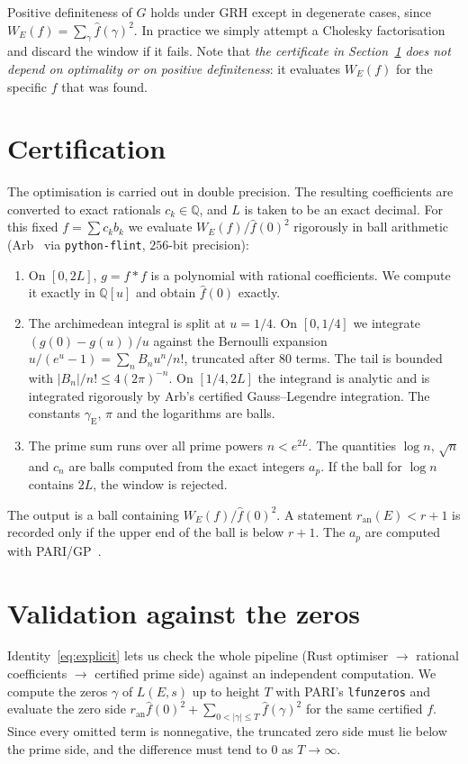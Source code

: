 \documentclass[11pt]{amsart}
\theoremstyle{remark}
\theoremstyle{definition}
\newcommand{\Q}{\mathbb{Q}}
\newcommand{\ran}{r_{\mathrm{an}}}
\begin{document}
Positive definiteness of $G$ holds under GRH except in degenerate cases, since $W_E(f)=\sum_\gamma\hat f(\gamma)^2$. In practice we simply attempt a Cholesky factorisation and discard the window if it fails. Note that \emph{the certificate in Section~\ref{sec:cert} does not depend on optimality or on positive definiteness}: it evaluates $W_E(f)$ for the specific $f$ that was found.

\section{Certification}\label{sec:cert}

The optimisation is carried out in double precision. The resulting coefficients are converted to exact rationals $c_k\in\Q$, and $L$ is taken to be an exact decimal. For this fixed $f=\sum c_k b_k$ we evaluate $W_E(f)/\hat f(0)^2$ rigorously in ball arithmetic (Arb~\cite{Arb} via \texttt{python-flint}, $256$-bit precision):
\begin{enumerate}
\item On $[0,2L]$, $g=f*f$ is a polynomial with rational coefficients. We compute it exactly in $\Q[u]$ and obtain $\hat f(0)$ exactly.
\item The archimedean integral is split at $u=1/4$. On $[0,1/4]$ we integrate $(g(0)-g(u))/u$ against the Bernoulli expansion $u/(e^u-1)=\sum_n B_n u^n/n!$, truncated after $80$ terms. The tail is bounded with $|B_n|/n!\le 4(2\pi)^{-n}$. On $[1/4,2L]$ the integrand is analytic and is integrated rigorously by Arb's certified Gauss--Legendre integration. The constants $\gamma_{\mathrm E}$, $\pi$ and the logarithms are balls.
\item The prime sum runs over all prime powers $n<e^{2L}$. The quantities $\log n$, $\sqrt n$ and $c_n$ are balls computed from the exact integers $a_p$. If the ball for $\log n$ contains $2L$, the window is rejected.
\end{enumerate}
The output is a ball containing $W_E(f)/\hat f(0)^2$. A statement $\ran(E)<r+1$ is recorded only if the upper end of the ball is below $r+1$. The $a_p$ are computed with PARI/GP~\cite{PARI}.

\section{Validation against the zeros}\label{sec:zeros}

Identity~\eqref{eq:explicit} lets us check the whole pipeline (Rust optimiser $\to$ rational coefficients $\to$ certified prime side) against an independent computation. We compute the zeros $\gamma$ of $L(E,s)$ up to height $T$ with PARI's \texttt{lfunzeros} and evaluate the zero side $\ran\hat f(0)^2+\sum_{0<|\gamma|\le T}\hat f(\gamma)^2$ for the same certified $f$. Since every omitted term is nonnegative, the truncated zero side must lie below the prime side, and the difference must tend to $0$ as $T\to\infty$.
\end{document}
